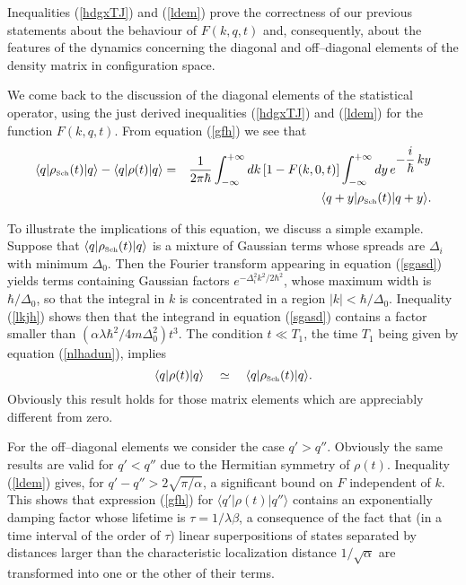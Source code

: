 \documentclass[10pt,a4paper]{article}
\begin{document}
Inequalities (\ref{hdgxTJ}) and (\ref{ldem}) prove the correctness
of our previous statements about the behaviour of $F(k,q,t)$ and,
consequently, about the features of the dynamics concerning the
diagonal and off--diagonal elements of the density matrix in
configuration space.

We come back to the discussion of the diagonal elements of the
statistical operator, using the just derived inequalities
(\ref{hdgxTJ}) and (\ref{ldem}) for the function $F(k,q,t)$. From
equation (\ref{gfh}) we see that
\begin{eqnarray} \label{sgasd}
\langle q| \rho_{\makebox{\tiny Sch}}(t)| q\rangle - \langle q|
\rho(t)| q\rangle & = & \frac{1}{2\pi\hbar}
\int_{-\infty}^{+\infty} dk\, [1-F(k,0,t)]
\int_{-\infty}^{+\infty} dy\, e^{\displaystyle -\frac{i}{\hbar} \,
ky} \nonumber \\ & & \langle q+y|\rho_{\makebox{\tiny Sch}}(t)|
q+y\rangle.
\end{eqnarray}

To illustrate the implications of this equation, we discuss a
simple example. Suppose that $\langle q| \rho_{\makebox{\tiny
Sch}}(t)| q\rangle$ is a mixture of Gaussian terms whose spreads
are $\Delta_{i}$ with minimum $\Delta_{0}$. Then the Fourier
transform appearing in equation (\ref{sgasd}) yields terms
containing Gaussian factors $e^{-\Delta_{i}^{2}k^{2}/2\hbar^{2}}$,
whose maximum width is $\hbar/\Delta_{0}$, so that the integral in
$k$ is concentrated in a region $|k| < \hbar/\Delta_{0}$.
Inequality (\ref{lkjh}) shows then that the integrand in equation
(\ref{sgasd}) contains a factor smaller than
$(\alpha\lambda\hbar^{2}/4m\Delta_{0}^{2}) t^{3}$. The condition
$t \ll T_{1}$, the time $T_{1}$ being given by equation
(\ref{nlhadun}), implies
\begin{equation}
\langle q| \rho(t)| q\rangle \quad \simeq \quad \langle q|
\rho_{\makebox{\tiny Sch}}(t)| q\rangle.
\end{equation}
Obviously this result holds for those matrix elements which are
appreciably different from zero.

For the off--diagonal elements we consider the case $q' > q''$.
Obviously the same results are valid for $q' < q''$ due to the
Hermitian symmetry of $\rho(t)$. Inequality (\ref{ldem}) gives,
for $q' - q'' > 2\sqrt{\pi/\alpha}$, a significant bound on $F$
independent of $k$. This shows that expression (\ref{gfh}) for
$\langle q'|\rho(t)| q''\rangle$ contains an exponentially damping
factor whose lifetime is $\tau  = 1/\lambda\beta$, a consequence
of the fact that (in a time interval of the order of $\tau$)
linear superpositions of states separated by distances larger than
the characteristic localization distance $1/\sqrt{\alpha}$ are
transformed into one or the other of their terms.
\end{document}
